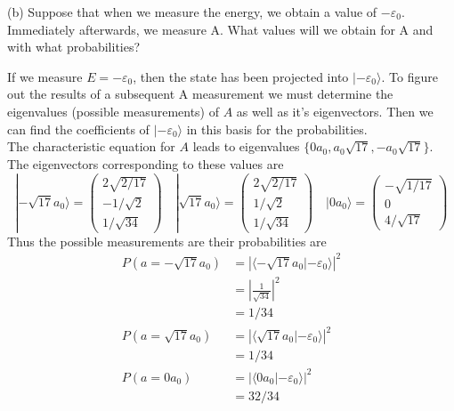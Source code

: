 \documentclass[a4paper, 11pt]{article}
\newcommand{\ket}[1]{|#1\rangle}
\newcommand{\braket}[2]{\langle #1 | #2 \rangle}
\newenvironment{solution}{%
	\begin{list}{}{%
			\setlength{\topsep}{0pt}%
			\setlength{\leftmargin}{1.5cm}%
			\setlength{\rightmargin}{1.5cm}%
			\setlength{\listparindent}{\parindent}%
			\setlength{\itemindent}{\parindent}%
			\setlength{\parsep}{\parskip}%
		}%
		\item[]}{\end{list}}
\begin{document}
\noindent(b) Suppose that when we measure the energy, we obtain a value of $-\varepsilon_0$. Immediately afterwards, we measure A. What values will we obtain for A and with what probabilities? \\
	\begin{solution}
			\noindent If we measure $E=-\varepsilon_0$, then the state has been projected into $\ket{-\varepsilon_0}$. To figure out the results of a subsequent A measurement we must determine the eigenvalues (possible measurements) of $A$ as well as it's eigenvectors. Then we can find the coefficients of $\ket{-\varepsilon_0}$ in this basis for the probabilities. \\ 
			
			\noindent The characteristic equation for $A$ leads to eigenvalues $\{0a_0, a_0\sqrt{17}, -a_0\sqrt{17}\}$. The eigenvectors corresponding to these values are 
				\begin{equation*}
					\ket{-\sqrt{17}a_0} = \begin{pmatrix}2\sqrt{2/17} \\ -1/\sqrt{2}\\ 1/\sqrt{34}\end{pmatrix} \quad 	\ket{\sqrt{17}a_0} = \begin{pmatrix}2\sqrt{2/17} \\ 1/\sqrt{2} \\ 1/\sqrt{34}\end{pmatrix} \quad 	\ket{0a_0} = \begin{pmatrix}-\sqrt{1/17} \\ 0 \\ 4/\sqrt{17}\end{pmatrix}
				\end{equation*}
			Thus the possible measurements are their probabilities are 
				\begin{align*}
					P\left(a=-\sqrt{17}a_0\right) &= \left|\braket{-\sqrt{17}a_0}{-\varepsilon_0}\right|^2 \\ 
						&= \left|\frac{1}{\sqrt{34}}\right|^2 \\ 
						&= 1/34 \\ 
					P\left(a=\sqrt{17}a_0\right) &= \left|\braket{\sqrt{17}a_0}{-\varepsilon_0}\right|^2 \\
						&= 1/34 \\ 
					P\left(a=0a_0\right) &= \left|\braket{0a_0}{-\varepsilon_0}\right|^2 \\ 
						&= 32/34
				\end{align*}
	\end{solution}
\end{document}

